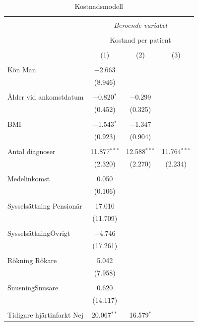 \begin{table}[!htbp] \centering 
  \caption{Kostnadsmodell} 
  \label{} 
\begin{tabular}{@{\extracolsep{5pt}}lccc} 
\\[-1.8ex]\hline 
\hline \\[-1.8ex] 
 & \multicolumn{3}{c}{\textit{Beroende variabel}} \\ 
\cline{2-4} 
\\[-1.8ex] & \multicolumn{3}{c}{Kostnad per patient} \\ 
\\[-1.8ex] & (1) & (2) & (3)\\ 
\hline \\[-1.8ex] 
 Kön Man & $-$2.663 &  &  \\ 
  & (8.946) &  &  \\ 
  & & & \\ 
 Ålder vid ankomstdatum  & $-$0.820$^{*}$ & $-$0.299 &  \\ 
  & (0.452) & (0.325) &  \\ 
  & & & \\ 
 BMI & $-$1.543$^{*}$ & $-$1.347 &  \\ 
  & (0.923) & (0.904) &  \\ 
  & & & \\ 
 Antal diagnoser & 11.877$^{***}$ & 12.588$^{***}$ & 11.764$^{***}$ \\ 
  & (2.320) & (2.270) & (2.234) \\ 
  & & & \\ 
 Medelinkomst & 0.050 &  &  \\ 
  & (0.106) &  &  \\ 
  & & & \\ 
 Sysselsättning  Pensionär & 17.010 &  &  \\ 
  & (11.709) &  &  \\ 
  & & & \\ 
 SysselsättningÖvrigt & $-$4.746 &  &  \\ 
  & (17.261) &  &  \\ 
  & & & \\ 
 Rökning  Rökare & 5.042 &  &  \\ 
  & (7.958) &  &  \\ 
  & & & \\ 
 SnusningSnusare & 0.620 &  &  \\ 
  & (14.117) &  &  \\ 
  & & & \\ 
 Tidigare hjärtinfarkt Nej & 20.067$^{**}$ & 16.579$^{*}$ &  \\ 

\end{tabular}
\end{table}
